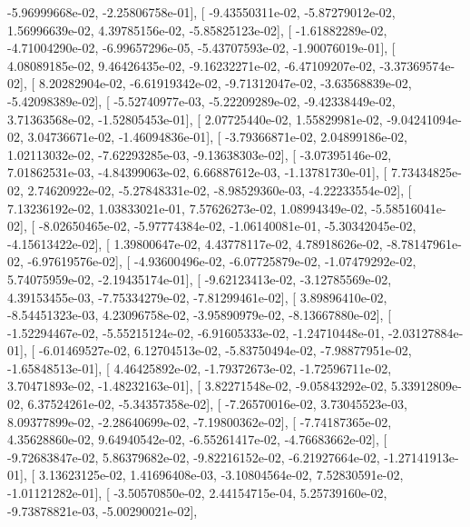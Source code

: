 \documentclass{article}
\begin{document}
         -5.96999668e-02,  -2.25806758e-01],
       [ -9.43550311e-02,  -5.87279012e-02,   1.56996639e-02,
          4.39785156e-02,  -5.85825123e-02],
       [ -1.61882289e-02,  -4.71004290e-02,  -6.99657296e-05,
         -5.43707593e-02,  -1.90076019e-01],
       [  4.08089185e-02,   9.46426435e-02,  -9.16232271e-02,
         -6.47109207e-02,  -3.37369574e-02],
       [  8.20282904e-02,  -6.61919342e-02,  -9.71312047e-02,
         -3.63568839e-02,  -5.42098389e-02],
       [ -5.52740977e-03,  -5.22209289e-02,  -9.42338449e-02,
          3.71363568e-02,  -1.52805453e-01],
       [  2.07725440e-02,   1.55829981e-02,  -9.04241094e-02,
          3.04736671e-02,  -1.46094836e-01],
       [ -3.79366871e-02,   2.04899186e-02,   1.02113032e-02,
         -7.62293285e-03,  -9.13638303e-02],
       [ -3.07395146e-02,   7.01862531e-03,  -4.84399063e-02,
          6.66887612e-03,  -1.13781730e-01],
       [  7.73434825e-02,   2.74620922e-02,  -5.27848331e-02,
         -8.98529360e-03,  -4.22233554e-02],
       [  7.13236192e-02,   1.03833021e-01,   7.57626273e-02,
          1.08994349e-02,  -5.58516041e-02],
       [ -8.02650465e-02,  -5.97774384e-02,  -1.06140081e-01,
         -5.30342045e-02,  -4.15613422e-02],
       [  1.39800647e-02,   4.43778117e-02,   4.78918626e-02,
         -8.78147961e-02,  -6.97619576e-02],
       [ -4.93600496e-02,  -6.07725879e-02,  -1.07479292e-02,
          5.74075959e-02,  -2.19435174e-01],
       [ -9.62123413e-02,  -3.12785569e-02,   4.39153455e-03,
         -7.75334279e-02,  -7.81299461e-02],
       [  3.89896410e-02,  -8.54451323e-03,   4.23096758e-02,
         -3.95890979e-02,  -8.13667880e-02],
       [ -1.52294467e-02,  -5.55215124e-02,  -6.91605333e-02,
         -1.24710448e-01,  -2.03127884e-01],
       [ -6.01469527e-02,   6.12704513e-02,  -5.83750494e-02,
         -7.98877951e-02,  -1.65848513e-01],
       [  4.46425892e-02,  -1.79372673e-02,  -1.72596711e-02,
          3.70471893e-02,  -1.48232163e-01],
       [  3.82271548e-02,  -9.05843292e-02,   5.33912809e-02,
          6.37524261e-02,  -5.34357358e-02],
       [ -7.26570016e-02,   3.73045523e-03,   8.09377899e-02,
         -2.28640699e-02,  -7.19800362e-02],
       [ -7.74187365e-02,   4.35628860e-02,   9.64940542e-02,
         -6.55261417e-02,  -4.76683662e-02],
       [ -9.72683847e-02,   5.86379682e-02,  -9.82216152e-02,
         -6.21927664e-02,  -1.27141913e-01],
       [  3.13623125e-02,   1.41696408e-03,  -3.10804564e-02,
          7.52830591e-02,  -1.01121282e-01],
       [ -3.50570850e-02,   2.44154715e-04,   5.25739160e-02,
         -9.73878821e-03,  -5.00290021e-02],
\end{document}

